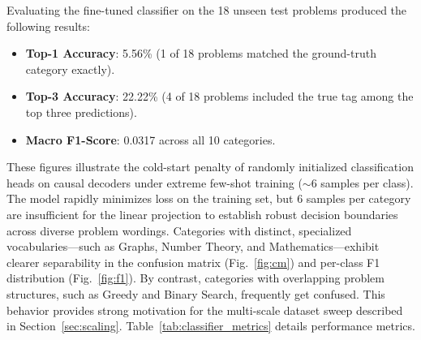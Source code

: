 \documentclass[journal]{IEEEtran}
\begin{document}
Evaluating the fine-tuned classifier on the 18 unseen test problems produced the following results:
\begin{itemize}
    \item \textbf{Top-1 Accuracy}: 5.56\% (1 of 18 problems matched the ground-truth category exactly).
    \item \textbf{Top-3 Accuracy}: 22.22\% (4 of 18 problems included the true tag among the top three predictions).
    \item \textbf{Macro F1-Score}: 0.0317 across all 10 categories.
\end{itemize}

These figures illustrate the cold-start penalty of randomly initialized classification heads on causal decoders under extreme few-shot training ($\sim 6$ samples per class). The model rapidly minimizes loss on the training set, but 6 samples per category are insufficient for the linear projection to establish robust decision boundaries across diverse problem wordings. Categories with distinct, specialized vocabularies---such as Graphs, Number Theory, and Mathematics---exhibit clearer separability in the confusion matrix (Fig.~\ref{fig:cm}) and per-class F1 distribution (Fig.~\ref{fig:f1}). By contrast, categories with overlapping problem structures, such as Greedy and Binary Search, frequently get confused. This behavior provides strong motivation for the multi-scale dataset sweep described in Section~\ref{sec:scaling}. Table~\ref{tab:classifier_metrics} details performance metrics.

\begin{table}[!t]
\caption{Stage~1 Classifier Performance on Unseen Test Problems}
\label{tab:classifier_metrics}
\centering
{}
\end{table}
\end{document}
